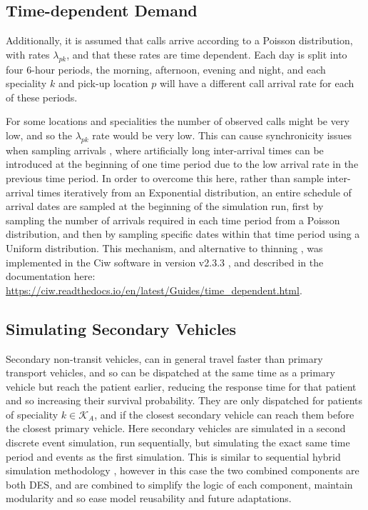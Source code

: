 \documentclass[numbers,webpdf,imaman]{ima-authoring-template}%
\begin{document}
\subsection{Time-dependent Demand}
Additionally, it is assumed that calls arrive according to a Poisson
distribution, with rates $\lambda_{pk}$, and that these rates are time
dependent. Each day is split into four 6-hour periods, the morning, afternoon,
evening and night, and each speciality $k$ and pick-up location $p$ will have
a different call arrival rate for each of these periods.

For some locations and specialities the number of observed calls might be very
low, and so the $\lambda_{pk}$ rate would be very low. This can cause
synchronicity issues when sampling arrivals \citep{pidd2004computer}, where
artificially long inter-arrival times can be introduced at the beginning of
one time period due to the low arrival rate in the previous time period.
In order to overcome this here, rather than sample inter-arrival times
iteratively from an Exponential distribution, an entire schedule of arrival
dates are sampled at the beginning of the simulation run, first by sampling
the number of arrivals required in each time period from a Poisson
distribution, and then by sampling specific dates within that time period
using a Uniform distribution.
This mechanism, and alternative to thinning \citep{lewisshedler79}, was
implemented in the Ciw software in version v2.3.3 \citep{ciw233}, and described
in the documentation here:
\url{https://ciw.readthedocs.io/en/latest/Guides/time_dependent.html}.


\subsection{Simulating Secondary Vehicles}\label{sec:simulation_secondary}
Secondary non-transit vehicles, can in general travel faster than primary
transport vehicles, and so can be dispatched at the same time as a primary
vehicle but reach the patient earlier, reducing the response time for that
patient and so increasing their survival probability. They are only dispatched
for patients of speciality $k \in \mathcal{K}_A$, and if the closest secondary
vehicle can reach them before the closest primary vehicle.
Here secondary vehicles are simulated in a second discrete event simulation,
run sequentially, but simulating the exact same time period and events as the
first simulation. This is similar to sequential hybrid simulation methodology
\citep{brailsfordetal19, morganetal17}, however in this case the two combined
components are both DES, and are combined to simplify the logic of each
component, maintain modularity and so ease model reusability and future
adaptations.
\end{document}
